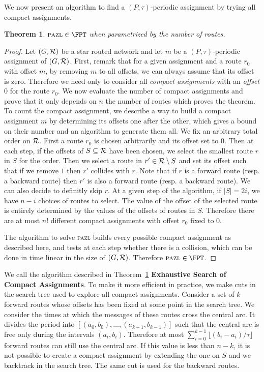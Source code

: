 \documentclass[a4paper,10pt]{article}
\newtheorem{theorem}{Theorem}
\newcommand\pazl{\textsc{pazl}\xspace}
\begin{document}
We now present an algorithm to find a $(P,\tau)$-periodic assignment by trying all compact assignments.

\begin{theorem}\label{th:FPT}
$\pazl \in \FPT$ when parametrized by the number of routes.
\end{theorem}
\begin{proof}
Let $(G, {\cal R})$ be a star routed network and let $m$ be a $(P,\tau)$-periodic assignment of $(G, {\cal R})$. First, remark that for a given assignment and a route $r_0$ with offset $m$, by removing $m$ to all offsets, we can always assume that its offset is zero. Therefore we need only to consider all \emph{compact assignments} with an \emph{offset $0$} for the route $r_0$. 
We now evaluate the number of compact assignments and prove that it only depends
on $n$ the number of routes which proves the theorem. To count the compact assignment, we describe a way to build a compact assignment $m$ by determining its offsets one after the other, which gives a bound on their number and an algorithm to generate them all. We fix an arbitrary total order on ${\cal R}$.
First a route $r_0$ is chosen arbitrarily and its offset set to $0$. 
Then at each step, if the offsets of $S \subseteq  {\cal R}$ have been chosen,
we select the smallest route $r$ in $S$ for the order. 
Then we select a route in $r' \in {\cal R} \setminus S$ and set its offset such that 
if we remove $1$ then $r'$ collides with $r$. Note that if $r$ is a forward route (resp. a backward route) then $r'$ is also a forward route (resp. a backward route). We can also decide to definitly skip $r$. At a given step of the algorithm, if $|S| = 2i$, we have $n-i$ choices 
of routes to select. The value of the offset of the selected route is entirely determined by the values of the offsets of routes in $S$. Therefore there are at most $n!$ different compact assignments with offset $r_0$ fixed to $0$. 

The algorithm to solve \pazl builds every possible compact assignment as described here, and
tests at each step whether there is a collision, which can be done in time linear in the size of 
$(G, {\cal R})$. Therefore $\pazl \in \FPT$.
\end{proof}

We call the algorithm described in Theorem~\ref{th:FPT} \textbf{Exhaustive Search of Compact Assignments}. To make it more efficient in practice, we make cuts in the search tree used to explore all compact assignments. Consider a set of $k$ forward routes whose offsets has been fixed at some point in the search tree. We consider the times at which the messages of these routes cross the central arc. It divides the period into $[(a_0,b_0), \dots, (a_{k-1},b_{k-1})]$ such that the central arc is free only during the intervals $(a_i,b_i)$. Therefore at most $\displaystyle{ \sum_{i=0}^{k-1} \lfloor(b_{i} -a_i)/\tau\rfloor} $ forward routes can still use the central arc. If this value is less than $n - k$, it is not possible to create a compact assignment by extending the one on $S$ and we backtrack in the search tree. The same cut is used for the backward routes.
\end{document}
